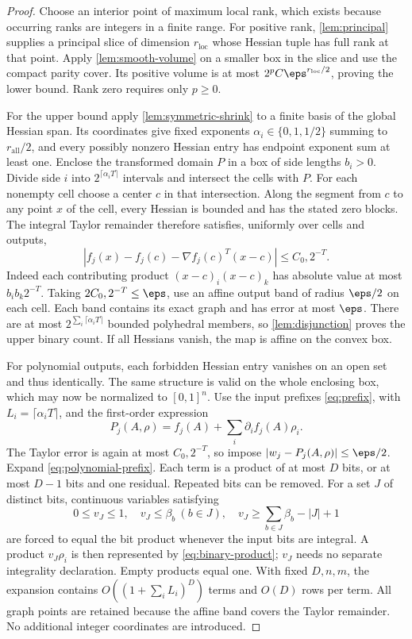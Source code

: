 \begin{proof}
Choose an interior point of maximum local rank, which exists because
occurring ranks are integers in a finite range. For positive rank,
\cref{lem:principal} supplies a principal slice of dimension
$r_{\mathrm{loc}}$ whose Hessian tuple has full rank at that point.
Apply \cref{lem:smooth-volume} on a smaller box in the slice and use
the compact parity cover. Its positive volume is at most
$2^pC\eps^{r_{\mathrm{loc}}/2}$, proving the lower bound. Rank zero
requires only $p\ge0$.

For the upper bound apply \cref{lem:symmetric-shrink} to a finite
basis of the global Hessian span. Its coordinates give fixed exponents
$\alpha_i\in\{0,1,1/2\}$ summing to $r_{\mathrm{all}}/2$, and every
possibly nonzero Hessian entry has endpoint exponent sum at least one.
Enclose the transformed domain $P$ in a box of side lengths $b_i>0$.
Divide side $i$ into $2^{\lceil\alpha_iT\rceil}$ intervals and intersect
the cells with $P$. For each nonempty cell choose a center $c$ in that
intersection. Along the segment from $c$ to any point $x$ of the cell,
every Hessian is bounded and has the stated zero blocks. The integral
Taylor remainder therefore satisfies, uniformly over cells and outputs,
\[
 |f_j(x)-f_j(c)-\nabla f_j(c)^T(x-c)|\le C_0,2^{-T}.
\]
Indeed each contributing product $(x-c)_i(x-c)_k$ has absolute value
at most $b_i b_k2^{-T}$. Taking $2C_0,2^{-T}\le\eps$, use an affine
output band of radius $\eps/2$ on each cell. Each band contains its
exact graph and has error at most $\eps$. There are at most
$2^{\sum_i\lceil\alpha_iT\rceil}$ bounded polyhedral members, so
\cref{lem:disjunction} proves the upper binary count. If all Hessians
vanish, the map is affine on the convex box.

For polynomial outputs, each forbidden Hessian entry vanishes on an
open set and thus identically. The same structure is valid on the
whole enclosing box, which may now be normalized to $[0,1]^n$.
Use the input prefixes \eqref{eq:prefix}, with
$L_i=\lceil\alpha_iT\rceil$, and the first-order expression
\begin{equation}\label{eq:polynomial-prefix}
 P_j(A,\rho)=f_j(A)+\sum_i\partial_i f_j(A)\rho_i.
\end{equation}
The Taylor error is again at most $C_0,2^{-T}$, so impose
$|w_j-P_j(A,\rho)|\le\eps/2$. Expand \eqref{eq:polynomial-prefix}.
Each term is a product of at most $D$ bits, or at most $D-1$ bits and
one residual. Repeated bits can be removed. For a set $J$ of distinct
bits, continuous variables satisfying
\[
 0\le v_J\le1,\quad v_J\le\beta_b\ (b\in J),\quad
 v_J\ge\sum_{b\in J}\beta_b-|J|+1
\]
are forced to equal the bit product whenever the input bits are integral.
A product $v_J\rho_i$ is then represented by
\eqref{eq:binary-product}; $v_J$ needs no separate integrality declaration.
Empty products equal one. With fixed $D,n,m$, the expansion contains
$O((1+\sum_iL_i)^D)$ terms and $O(D)$ rows per term. All graph points
are retained because the affine band covers the Taylor remainder.
No additional integer coordinates are introduced.
\end{proof}

